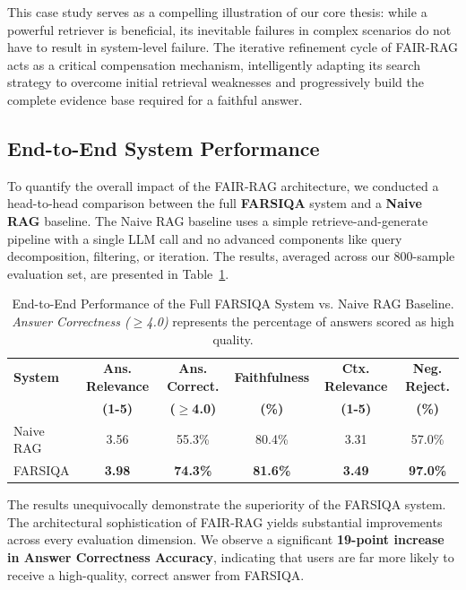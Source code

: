 \documentclass[11pt]{article}
\begin{document}
This case study serves as a compelling illustration of our core thesis: while a powerful retriever is beneficial, its inevitable failures in complex scenarios do not have to result in system-level failure. The iterative refinement cycle of FAIR-RAG acts as a critical compensation mechanism, intelligently adapting its search strategy to overcome initial retrieval weaknesses and progressively build the complete evidence base required for a faithful answer.

\subsection{End-to-End System Performance}

To quantify the overall impact of the FAIR-RAG architecture, we conducted a head-to-head comparison between the full \textbf{FARSIQA} system and a \textbf{Naive RAG} baseline. The Naive RAG baseline uses a simple retrieve-and-generate pipeline with a single LLM call and no advanced components like query decomposition, filtering, or iteration. The results, averaged across our 800-sample evaluation set, are presented in Table~\ref{tab:e2e-performance}.

\begin{table}[t]
\centering
\footnotesize
\begin{tabular}{lccccc}
\hline
\textbf{System} & \textbf{Ans. Relevance} & \textbf{Ans. Correct.} & \textbf{Faithfulness} & \textbf{Ctx. Relevance} & \textbf{Neg. Reject.} \\
& \textbf{(1-5)} & \textbf{($\geq$4.0)} & \textbf{(\%)} & \textbf{(1-5)} & \textbf{(\%)} \\
\hline
Naive RAG & 3.56 & 55.3\% & 80.4\% & 3.31 & 57.0\% \\
FARSIQA & \textbf{3.98} & \textbf{74.3\%} & \textbf{81.6\%} & \textbf{3.49} & \textbf{97.0\%} \\
\hline
\end{tabular}
\caption{End-to-End Performance of the Full FARSIQA System vs. Naive RAG Baseline. \emph{Answer Correctness ($\geq$4.0)} represents the percentage of answers scored as high quality.}
\label{tab:e2e-performance}
\end{table}

The results unequivocally demonstrate the superiority of the FARSIQA system. The architectural sophistication of FAIR-RAG yields substantial improvements across every evaluation dimension. We observe a significant \textbf{19-point increase in Answer Correctness Accuracy}, indicating that users are far more likely to receive a high-quality, correct answer from FARSIQA.
\end{document}
